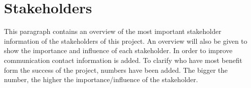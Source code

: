 \section{Stakeholders}

This paragraph contains an overview of the most important stakeholder information of the stakeholders of this project. An overview will also be given to show the importance and influence of each stakeholder. In order to improve communication contact information is added. To clarify who have most benefit form the success of the project, numbers have been added. The bigger the number, the higher the importance/influence of the stakeholder.

